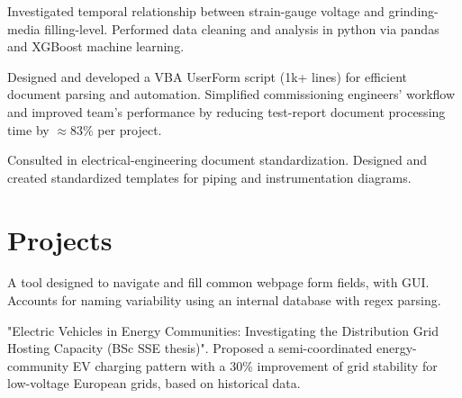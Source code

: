 \documentclass[]{plushcv}
\begin{document}
\begin{minipage}[t]{0.70\textwidth}
	\begin{tightemize}
		\item Investigated temporal relationship between strain-gauge voltage and grinding-media filling-level. Performed data cleaning and analysis in python via pandas and XGBoost machine learning.
		\item Designed and developed a VBA UserForm script (1k+ lines) for efficient document parsing and automation. Simplified commissioning engineers' workflow and improved team's performance by reducing test-report document processing time by $\approx$83\% per project. 
		\item Consulted in electrical-engineering document standardization. Designed and created standardized templates for piping and instrumentation diagrams.
	\end{tightemize}



\section{Projects}
	\begin{tightemize}
		\item A tool designed to navigate and fill common webpage form fields, with GUI. Accounts for naming variability using an internal database with regex parsing.
	\end{tightemize}
	\sectionsep

	\begin{tightemize}
	\item "Electric Vehicles in Energy Communities: Investigating the Distribution Grid Hosting Capacity (BSc SSE thesis)".	Proposed a semi-coordinated energy-community EV charging pattern with a 30\% improvement of grid stability for low-voltage European grids, based on historical data.
	\end{tightemize}






\end{minipage} \hfill
\end{document}
